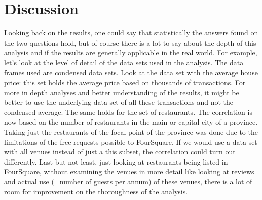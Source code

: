 \section{Discussion}
Looking back on the results, one could say that statistically the answers found on the two questions hold, but of course there is a lot to say about the depth of this analysis and if the results are generally applicable in the real world. For example, let's look at the level of detail of the data sets used in the analysis. The data frames used are condensed data sets. Look at the data set with the average house price: this set holds the average price based on thousands of transactions. For more in depth analyses and better understanding of the results, it might be better to use the underlying data set of all these transactions and not the condensed average. The same holds for the set of restaurants. The correlation is now based on the number of restaurants in the main or capital city of a province. Taking just the restaurants of the focal point of the province was done due to the limitations of the free requests possible to FourSquare. If we would use a data set with all venues instead of just a this subset, the correlation could turn out differently. Last but not least, just looking at restaurants being listed in FourSquare, without examining the venues in more detail like looking at reviews and actual use (=number of guests per annum) of these venues, there is a lot of room for improvement on the thoroughness of the analysis.